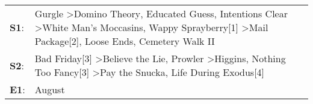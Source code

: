 \begin{supertabular}{p{0.03\textwidth}p{0.92\textwidth}}
 \textbf{S1}:  &  Gurgle\textsuperscript{} \textgreater \enspace Domino Theory\textsuperscript{}, \enspace Educated Guess\textsuperscript{}, \enspace Intentions Clear\textsuperscript{} \textgreater \enspace White Man's Moccasins\textsuperscript{}, \enspace Wappy Sprayberry[1]\textsuperscript{} \textgreater \enspace Mail Package[2]\textsuperscript{}, \enspace Loose Ends\textsuperscript{}, \enspace Cemetery Walk II\textsuperscript{}  \enspace  \\
 \textbf{S2}:  &                                                                                             Bad Friday[3]\textsuperscript{} \textgreater \enspace Believe the Lie\textsuperscript{}, \enspace Prowler\textsuperscript{} \textgreater \enspace Higgins\textsuperscript{}, \enspace Nothing Too Fancy[3]\textsuperscript{} \textgreater \enspace Pay the Snucka\textsuperscript{}, \enspace Life During Exodus[4]\textsuperscript{}  \enspace  \\
 \textbf{E1}:  &                                                                                                                                                                                                                                                                                                                                                                                                          August\textsuperscript{}  \enspace  \\
\end{supertabular}
